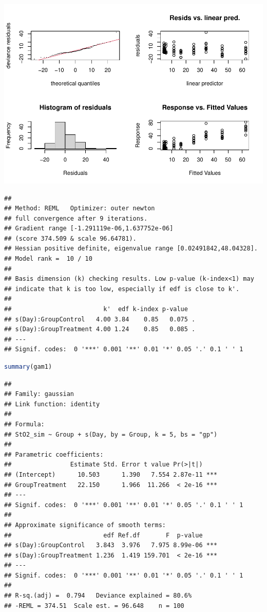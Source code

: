 \documentclass[
]{article}
\begin{document}
\includegraphics{Full_document_files/figure-latex/final-model-Appendix-1}

\begin{lstlisting}
## 
## Method: REML   Optimizer: outer newton
## full convergence after 9 iterations.
## Gradient range [-1.291119e-06,1.637752e-06]
## (score 374.509 & scale 96.64781).
## Hessian positive definite, eigenvalue range [0.02491842,48.04328].
## Model rank =  10 / 10 
## 
## Basis dimension (k) checking results. Low p-value (k-index<1) may
## indicate that k is too low, especially if edf is close to k'.
## 
##                         k'  edf k-index p-value  
## s(Day):GroupControl   4.00 3.84    0.85   0.075 .
## s(Day):GroupTreatment 4.00 1.24    0.85   0.085 .
## ---
## Signif. codes:  0 '***' 0.001 '**' 0.01 '*' 0.05 '.' 0.1 ' ' 1
\end{lstlisting}

\begin{lstlisting}[language=R]
summary(gam1)
\end{lstlisting}

\begin{lstlisting}
## 
## Family: gaussian 
## Link function: identity 
## 
## Formula:
## StO2_sim ~ Group + s(Day, by = Group, k = 5, bs = "gp")
## 
## Parametric coefficients:
##                Estimate Std. Error t value Pr(>|t|)    
## (Intercept)      10.503      1.390   7.554 2.87e-11 ***
## GroupTreatment   22.150      1.966  11.266  < 2e-16 ***
## ---
## Signif. codes:  0 '***' 0.001 '**' 0.01 '*' 0.05 '.' 0.1 ' ' 1
## 
## Approximate significance of smooth terms:
##                         edf Ref.df       F  p-value    
## s(Day):GroupControl   3.843  3.976   7.975 8.99e-06 ***
## s(Day):GroupTreatment 1.236  1.419 159.701  < 2e-16 ***
## ---
## Signif. codes:  0 '***' 0.001 '**' 0.01 '*' 0.05 '.' 0.1 ' ' 1
## 
## R-sq.(adj) =  0.794   Deviance explained = 80.6%
## -REML = 374.51  Scale est. = 96.648    n = 100
\end{lstlisting}
\end{document}
